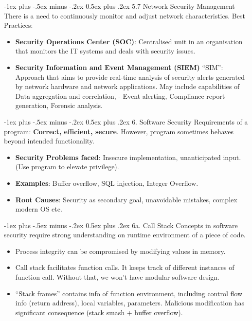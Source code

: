 \documentclass[10pt, landscape]{article}
\makeatletter
\renewcommand{\section}{\@startsection{section}{1}{0mm}%
                                {-1ex plus -.5ex minus -.2ex}%
                                {0.5ex plus .2ex}%
                                {\normalfont\large\bfseries}}
\makeatother
\begin{document}
\begin{multicols*}{3}
\section{5.7 Network Security Management}
There is a need to continuously monitor and adjust network characteristics. Best Practices:
\begin{itemize}
\item \textbf{Security Operations Center (SOC)}: Centralised unit in an organisation that monitors the IT systems and deals with security 
issues.
\item \textbf{Security Information and Event Management (SIEM)} “SIM”: Approach that aims to provide real-time analysis of 
security alerts generated by network hardware and network applications. May include capabilities of Data aggregation and correlation, - Event alerting, Compliance report generation, Forensic analysis.
\end{itemize}

\vfill \null
\columnbreak

\vfill \null
\columnbreak

\section{6. Software Security}
Requirements of a program: \textbf{Correct, efficient, secure}. However, program sometimes behaves beyond intended functionality.
\begin{itemize}
\item \textbf{Security Problems faced}: Insecure implementation, unanticipated input. (Use program to elevate privilege).
\item \textbf{Examples}: Buffer overflow, SQL injection, Integer Overflow.
\item \textbf{Root Causes}: Security as secondary goal, unavoidable mistakes, complex modern OS etc.
\end{itemize}

\section{6a. Call Stack}
Concepts in software security require strong understanding on runtime environment of a piece of code.

\begin{itemize}
\item Process integrity can be compromised by modifying values in memory. 
\item Call stack facilitates function calls. It keeps track of different instances of function call. Without 
that, we won’t have modular software design. 
\item “Stack frames” contains info of function environment, including control flow info (return address), local variables, parameters. Malicious modification has significant consequence (stack smash + buffer overflow).
\end{itemize}


\end{multicols*}
\end{document}
